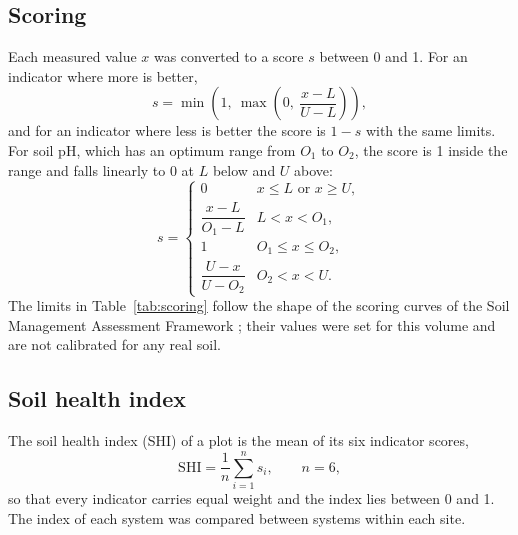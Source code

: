 \subsection{Scoring}
Each measured value $x$ was converted to a score $s$ between 0 and 1. For an
indicator where more is better,
\begin{equation}
  s = \min\!\left(1,\ \max\!\left(0,\ \frac{x - L}{U - L}\right)\right),
  \label{eq:more}
\end{equation}
and for an indicator where less is better the score is $1 - s$ with the same
limits. For soil pH, which has an optimum range from $O_1$ to $O_2$, the score
is 1 inside the range and falls linearly to 0 at $L$ below and $U$ above:
\begin{equation}
  s =
  \begin{cases}
    0 & x \le L \text{ or } x \ge U,\\[2pt]
    \dfrac{x - L}{O_1 - L} & L < x < O_1,\\[6pt]
    1 & O_1 \le x \le O_2,\\[2pt]
    \dfrac{U - x}{U - O_2} & O_2 < x < U.
  \end{cases}
  \label{eq:optimum}
\end{equation}
The limits in Table~\ref{tab:scoring} follow the shape of the scoring curves of
the Soil Management Assessment Framework \parencite{andrews2004}; their values
were set for this volume and are not calibrated for any real soil.

\subsection{Soil health index}
The soil health index (SHI) of a plot is the mean of its six indicator scores,
\begin{equation}
  \mathrm{SHI} = \frac{1}{n}\sum_{i=1}^{n} s_i, \qquad n = 6,
  \label{eq:shi}
\end{equation}
so that every indicator carries equal weight and the index lies between 0 and
1. The index of each system was compared between systems within each site.
